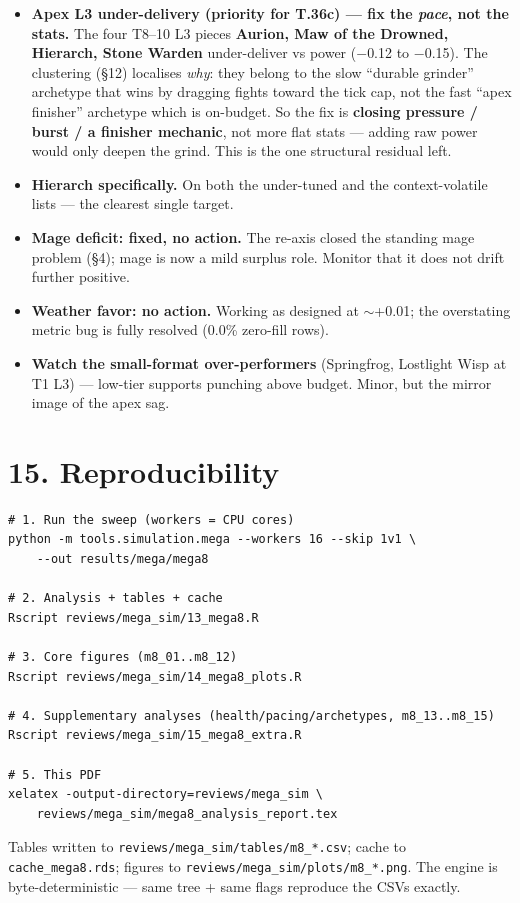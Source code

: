 \documentclass[10pt]{article}
\begin{document}
\begin{itemize}
\item \textbf{Apex L3 under-delivery (priority for T.36c) --- fix the \emph{pace}, not the stats.} The four T8--10 L3 pieces \textbf{Aurion, Maw of the Drowned, Hierarch, Stone Warden} under-deliver vs power ($-$0.12 to $-$0.15). The clustering (\S{}12) localises \emph{why}: they belong to the slow ``durable grinder'' archetype that wins by dragging fights toward the tick cap, not the fast ``apex finisher'' archetype which is on-budget. So the fix is \textbf{closing pressure / burst / a finisher mechanic}, not more flat stats --- adding raw power would only deepen the grind. This is the one structural residual left.
\item \textbf{Hierarch specifically.} On both the under-tuned and the context-volatile lists --- the clearest single target.
\item \textbf{Mage deficit: fixed, no action.} The re-axis closed the standing mage problem (\S{}4); mage is now a mild surplus role. Monitor that it does not drift further positive.
\item \textbf{Weather favor: no action.} Working as designed at $\sim$+0.01; the overstating metric bug is fully resolved (0.0\% zero-fill rows).
\item \textbf{Watch the small-format over-performers} (Springfrog, Lostlight Wisp at T1 L3) --- low-tier supports punching above budget. Minor, but the mirror image of the apex sag.
\end{itemize}

\section*{15. Reproducibility}

\begin{lstlisting}
# 1. Run the sweep (workers = CPU cores)
python -m tools.simulation.mega --workers 16 --skip 1v1 \
    --out results/mega/mega8

# 2. Analysis + tables + cache
Rscript reviews/mega_sim/13_mega8.R

# 3. Core figures (m8_01..m8_12)
Rscript reviews/mega_sim/14_mega8_plots.R

# 4. Supplementary analyses (health/pacing/archetypes, m8_13..m8_15)
Rscript reviews/mega_sim/15_mega8_extra.R

# 5. This PDF
xelatex -output-directory=reviews/mega_sim \
    reviews/mega_sim/mega8_analysis_report.tex
\end{lstlisting}

Tables written to \texttt{reviews/\allowbreak{}mega\_\allowbreak{}sim/\allowbreak{}tables/\allowbreak{}m8\_\allowbreak{}*.\allowbreak{}csv}; cache to \texttt{cache\_\allowbreak{}mega8.\allowbreak{}rds}; figures to \texttt{reviews/\allowbreak{}mega\_\allowbreak{}sim/\allowbreak{}plots/\allowbreak{}m8\_\allowbreak{}*.\allowbreak{}png}. The engine is byte-deterministic --- same tree + same flags reproduce the CSVs exactly.\\
\end{document}
